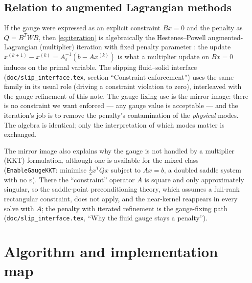 \documentclass[11pt]{article}
\newcommand{\eps}{\varepsilon}
\begin{document}
\subsection{Relation to augmented Lagrangian methods}

If the gauge were expressed as an explicit constraint $B x = 0$ and the
penalty as $Q = B^{T} W B$, then \eqref{eq:iteration} is algebraically
the Hestenes--Powell augmented-Lagrangian (multiplier) iteration with
fixed penalty parameter \cite{Hestenes1969,Powell1969,FortinGlowinski}:
the update $x^{(k+1)} - x^{(k)} = A_\eps^{-1}(b - A x^{(k)})$ is what a
multiplier update on $Bx = 0$ induces on the primal variable. The
slipping fluid--solid interface (\texttt{doc/slip\_interface.tex},
section ``Constraint enforcement'') uses the same family in its usual
role (driving a constraint violation to zero), interleaved with the
gauge refinement of this note.
The gauge-fixing use is the mirror image: there is no constraint we
want enforced --- any gauge value is acceptable --- and the iteration's
job is to remove the penalty's contamination of the \emph{physical}
modes. The algebra is identical; only the interpretation of which modes
matter is exchanged.

The mirror image also explains why the gauge is not handled by a
multiplier (KKT) formulation, although one is available for the mixed
class (\texttt{EnableGaugeKKT}: minimise $\tfrac12 x^T Q x$ subject to
$Ax = b$, a doubled saddle system with no $\eps$). There the
``constraint'' operator $A$ is square and only approximately singular,
so the saddle-point preconditioning theory, which assumes a full-rank
rectangular constraint, does not apply, and the near-kernel reappears in
every solve with $A$; the penalty with iterated refinement is the
gauge-fixing path (\texttt{doc/slip\_interface.tex}, ``Why the fluid gauge
stays a penalty'').

\section{Algorithm and implementation map}
\label{sec:algorithm}
\sloppy
\end{document}
